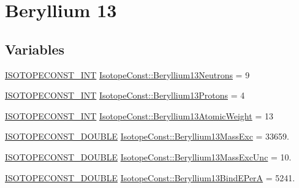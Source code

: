 \hypertarget{group___isotope_const-_beryllium-_be13}{}\section{Beryllium 13}
\label{group___isotope_const-_beryllium-_be13}
\subsection*{Variables}
\begin{DoxyCompactItemize}
\item 
\mbox{\hyperlink{group___isotope_const-_macros_ga5f18360b3e99483a35c32d789e62621c}{I\+S\+O\+T\+O\+P\+E\+C\+O\+N\+S\+T\+\_\+\+I\+NT}} \mbox{\hyperlink{group___isotope_const-_beryllium-_be13_ga572859a55ee34c149161751e0513c1d5}{Isotope\+Const\+::\+Beryllium13\+Neutrons}} = 9
\item 
\mbox{\hyperlink{group___isotope_const-_macros_ga5f18360b3e99483a35c32d789e62621c}{I\+S\+O\+T\+O\+P\+E\+C\+O\+N\+S\+T\+\_\+\+I\+NT}} \mbox{\hyperlink{group___isotope_const-_beryllium-_be13_ga28e6068f49a605d43c51d9d4ff7e373f}{Isotope\+Const\+::\+Beryllium13\+Protons}} = 4
\item 
\mbox{\hyperlink{group___isotope_const-_macros_ga5f18360b3e99483a35c32d789e62621c}{I\+S\+O\+T\+O\+P\+E\+C\+O\+N\+S\+T\+\_\+\+I\+NT}} \mbox{\hyperlink{group___isotope_const-_beryllium-_be13_ga1f65748962a2798d9ea4bb8cb2e7db1c}{Isotope\+Const\+::\+Beryllium13\+Atomic\+Weight}} = 13
\item 
\mbox{\hyperlink{group___isotope_const-_macros_ga8f45a7272ce02c0b4c65c44636ed719a}{I\+S\+O\+T\+O\+P\+E\+C\+O\+N\+S\+T\+\_\+\+D\+O\+U\+B\+LE}} \mbox{\hyperlink{group___isotope_const-_beryllium-_be13_ga1645a7b8cf9d142c54777e3c910918c6}{Isotope\+Const\+::\+Beryllium13\+Mass\+Exc}} = 33659.
\item 
\mbox{\hyperlink{group___isotope_const-_macros_ga8f45a7272ce02c0b4c65c44636ed719a}{I\+S\+O\+T\+O\+P\+E\+C\+O\+N\+S\+T\+\_\+\+D\+O\+U\+B\+LE}} \mbox{\hyperlink{group___isotope_const-_beryllium-_be13_ga67e62a00ad58b0f4d2444a2933d57ac6}{Isotope\+Const\+::\+Beryllium13\+Mass\+Exc\+Unc}} = 10.
\item 
\mbox{\hyperlink{group___isotope_const-_macros_ga8f45a7272ce02c0b4c65c44636ed719a}{I\+S\+O\+T\+O\+P\+E\+C\+O\+N\+S\+T\+\_\+\+D\+O\+U\+B\+LE}} \mbox{\hyperlink{group___isotope_const-_beryllium-_be13_gae50e5c925f8896596b244d09ec6e1a66}{Isotope\+Const\+::\+Beryllium13\+Bind\+E\+PerA}} = 5241.
\item 

\end{DoxyCompactItemize}
